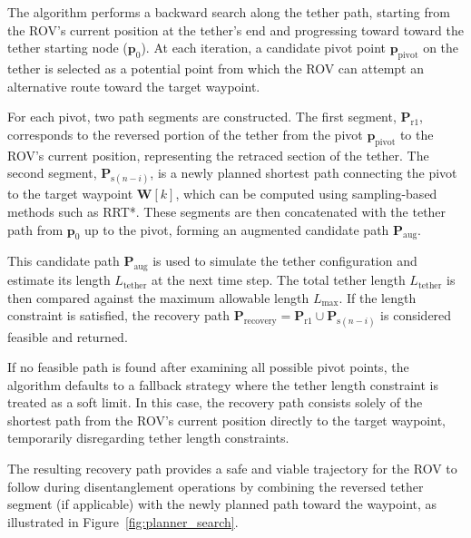 The algorithm performs a backward search along the tether path, starting from the \ac{ROV}’s current position at the tether’s end and progressing toward toward the tether starting node ($\mathbf{p}_0$). At each iteration, a candidate pivot point \(\mathbf{p}_{\mathrm{pivot}}\) on the tether is selected as a potential point from which the \ac{ROV} can attempt an alternative route toward the target waypoint.

For each pivot, two path segments are constructed. The first segment, \(\mathbf{P}_{\mathrm{r}1}\), corresponds to the reversed portion of the tether from the pivot \(\mathbf{p}_{\mathrm{pivot}}\) to the \ac{ROV}’s current position, representing the retraced section of the tether. The second segment, \(\mathbf{P}_{\mathrm{s}(n - i)}\), is a newly planned shortest path connecting the pivot to the target waypoint \(\mathbf{W}[k]\), which can be computed using sampling-based methods such as RRT*. These segments are then concatenated with the tether path from $\mathbf{p}_0$ up to the pivot, forming an augmented candidate path \(\mathbf{P}_{\mathrm{aug}}\).

This candidate path \(\mathbf{P}_{\mathrm{aug}}\) is used to simulate the tether configuration and estimate its length \(L_{\mathrm{tether}}\) at the next time step. The total tether length \(L_{\mathrm{tether}}\) is then compared against the maximum allowable length \(L_{\max}\). If the length constraint is satisfied, the recovery path \(\mathbf{P}_{\mathrm{recovery}} = \mathbf{P}_{\mathrm{r}1} \cup \mathbf{P}_{\mathrm{s}(n - i)}\) is considered feasible and returned.

If no feasible path is found after examining all possible pivot points, the algorithm defaults to a fallback strategy where the tether length constraint is treated as a soft limit. In this case, the recovery path consists solely of the shortest path from the \ac{ROV}’s current position directly to the target waypoint, temporarily disregarding tether length constraints.

The resulting recovery path provides a safe and viable trajectory for the \ac{ROV} to follow during disentanglement operations by combining the reversed tether segment (if applicable) with the newly planned path toward the waypoint, as illustrated in Figure~\ref{fig:planner_search}.










